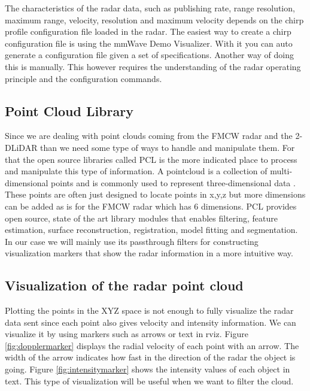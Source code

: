 The characteristics of the \ac{radar} data, such as publishing rate, range resolution, maximum range, velocity, resolution and maximum velocity depends on the chirp profile configuration file loaded in the \ac{radar}.
The easiest way to create a chirp configuration file is using the mmWave Demo Visualizer. With it you can auto generate a configuration file given a set of specifications.
Another way of doing this is manually. This however requires the understanding of the radar operating principle and the configuration commands.



\subsection{Point Cloud Library}
Since we are dealing with point clouds coming from the \ac{FMCW} \ac{radar} and the 2-D\ac{LiDAR} than we need some type of ways to handle and manipulate them. For that the open source libraries called \ac{PCL} is the more indicated place to process and manipulate this type of information. A pointcloud is a collection of multi-dimensional points and is commonly used to represent three-dimensional data \cite{pcl}. These points are often just designed to locate points in x,y,z but more dimensions can be added as is for the FMCW radar which has 6 dimensions. \ac{PCL} provides open source, state of the art library modules that enables  filtering, feature estimation, surface reconstruction, registration, model fitting and segmentation. In our case we will mainly use its passthrough filters for constructing visualization markers that show the \ac{radar} information in a more intuitive way.

\subsection{Visualization of the radar point cloud}
Plotting the points in the XYZ space is not enough to fully visualize the radar data sent since each point also gives velocity and intensity information. We can visualize it by using markers such as arrows or text in rviz.
Figure \ref{fig:dopplermarker} displays the radial velocity of each point with an arrow. The width of the arrow indicates how fast in the direction  of the radar the object is going. Figure \ref{fig:intensitymarker} shows the intensity values of each object in text. This type of visualization will be useful when we want to filter the cloud.


